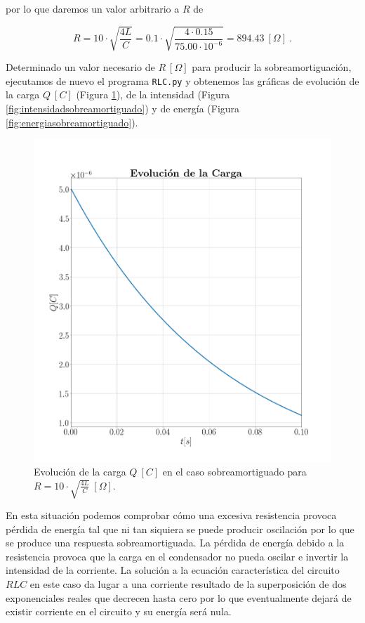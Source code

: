 \documentclass[journal]{IEEEtran}
\begin{document}
por lo que daremos un valor arbitrario a $R$ de 

\begin{equation}
R = 10 \cdot \sqrt{\frac{4L}{C}} = 0.1\cdot\sqrt{\frac{4\cdot 0.15}{75.00\cdot10^{-6}}} = 894.43~[\Omega]~.
\end{equation}

Determinado un valor necesario de $R~[\Omega]$ para producir la sobreamortiguación, ejecutamos de nuevo el programa \texttt{RLC.py} y obtenemos las gráficas de evolución de la carga $Q~[C]$ (Figura \ref{fig:cargasobreamortiguado}), de la intensidad (Figura \ref{fig:intensidadsobreamortiguado}) y de energía (Figura \ref{fig:energiasobreamortiguado}).

\begin{figure}[!htb]
    \centering
    \includegraphics[width=\linewidth,trim={70 70 70 70},clip]{cargasobreamortiguado.png}
    \caption{Evolución de la carga $Q~[C]$ en el caso sobreamortiguado para $R=10 \cdot\sqrt{\frac{4L}{C}}~[\Omega]$.}
    \label{fig:cargasobreamortiguado}
\end{figure}

En esta situación podemos comprobar cómo una excesiva resistencia provoca pérdida de energía tal que ni tan siquiera se puede producir oscilación por lo que se produce una respuesta sobreamortiguada. La pérdida de energía debido a la resistencia provoca que la carga en el condensador no pueda oscilar e invertir la intensidad de la corriente. La solución a la ecuación característica del circuito $RLC$ en este caso da lugar a una corriente resultado de la superposición de dos exponenciales reales que decrecen hasta cero por lo que eventualmente dejará de existir corriente en el circuito y su energía será nula.
\end{document}
